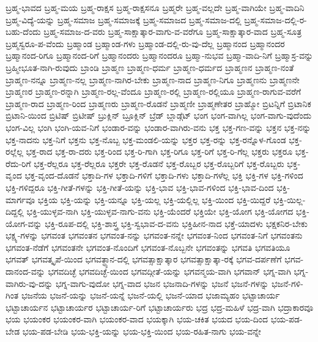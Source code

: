 {ಬ್ರಹ್ಮ-ಭಾವದ
ಬ್ರಹ್ಮ-ಮಯ
ಬ್ರಹ್ಮ-ರಾಕ್ಷಸ
ಬ್ರಹ್ಮ-ರಾಕ್ಷಸನೂ
ಬ್ರಹ್ಮರೇ
ಬ್ರಹ್ಮ-ವಲ್ಲದೇ
ಬ್ರಹ್ಮ-ವಾಗಿಯೇ
ಬ್ರಹ್ಮ-ವಾದಿನಿ
ಬ್ರಹ್ಮ-ವಿದ್ಯೆ-ಯನ್ನು
ಬ್ರಹ್ಮ-ಸಮಾಜ
ಬ್ರಹ್ಮ-ಸಮಾಜಕ್ಕೆ
ಬ್ರಹ್ಮ-ಸಮಾಜದ
ಬ್ರಹ್ಮ-ಸಮಾಜ-ದಲ್ಲಿ
ಬ್ರಹ್ಮ-ಸಮಾಜ-ದಲ್ಲಿ-ರ-ಬಹು-ದೆಂದು
ಬ್ರಹ್ಮ-ಸಮಾಜ-ದ-ವರು
ಬ್ರಹ್ಮ-ಸಾಕ್ಷಾತ್ಕಾರ-ವಾಗು-ವ-ವರೆಗೂ
ಬ್ರಹ್ಮ-ಸಾಕ್ಷಾತ್ಕಾರ-ವಾದ
ಬ್ರಹ್ಮ-ಸೂತ್ರ
ಬ್ರಹ್ಮಸ್ವರೂ-ಪ-ವೆಂದು
ಬ್ರಹ್ಮಾಂಡ
ಬ್ರಹ್ಮಾಂಡ-ಗಳು
ಬ್ರಹ್ಮಾಂಡ-ದಲ್ಲಿ-ರು-ವು-ದೆಲ್ಲ
ಬ್ರಹ್ಮಾನಂದ
ಬ್ರಹ್ಮಾನಂದರ
ಬ್ರಹ್ಮಾನಂದ-ರಿಗೂ
ಬ್ರಹ್ಮಾನಂದ-ರಿಗೆ
ಬ್ರಹ್ಮಾನಂದರು
ಬ್ರಹ್ಮಾನಂದರೂ
ಬ್ರಹ್ಮಾ-ನುಭವ
ಬ್ರಹ್ಮಾ-ವಾದಿ-ನಿಗೆ
ಬ್ರಹ್ಮಾಸ್ರ-ವನ್ನು
ಬ್ರಹ್ಮೀಭೂತ-ನಾಗಿ-ರುವುದು
ಬ್ರಾಂಡಿ
ಬ್ರಾಹ್ಮಣ
ಬ್ರಾಹ್ಮಣ-ಧರ್ಮ
ಬ್ರಾಹ್ಮಣ-ಧರ್ಮದ
ಬ್ರಾಹ್ಮಣನ
ಬ್ರಾಹ್ಮಣ-ನಂತೆ
ಬ್ರಾಹ್ಮಣ-ನನ್ನೂ
ಬ್ರಾಹ್ಮಣ-ನಲ್ಲ
ಬ್ರಾಹ್ಮಣ-ನಾಗಿರ-ಬೇಕು
ಬ್ರಾಹ್ಮಣ-ನಾದ
ಬ್ರಾಹ್ಮಣ-ನಿಗೂ
ಬ್ರಾಹ್ಮಣನು
ಬ್ರಾಹ್ಮಣನೇ
ಬ್ರಾಹ್ಮಣರ
ಬ್ರಾಹ್ಮಣ-ರನ್ನಾಗಿ
ಬ್ರಾಹ್ಮಣ-ರಲ್ಲ-ವೆಂದೂ
ಬ್ರಾಹ್ಮಣ-ರಲ್ಲಿ
ಬ್ರಾಹ್ಮಣ-ರಲ್ಲಿಯೂ
ಬ್ರಾಹ್ಮಣ-ರಾಗುವ-ವರೆಗೆ
ಬ್ರಾಹ್ಮಣ-ರಾದ
ಬ್ರಾಹ್ಮಣ-ರಿಂದ
ಬ್ರಾಹ್ಮಣರು
ಬ್ರಾಹ್ಮಣ-ರೊಡನೆ
ಬ್ರಾಹ್ಮಣೀ
ಬ್ರಾಹ್ಮಣೇತರ
ಬ್ರಾಹ್ಮೋ
ಬ್ರಿಟನ್ನಿಗೆ
ಬ್ರಿಟಾನಿಕ
ಬ್ರಿಟಾನಿ-ಯಿಂದ
ಬ್ರಿಟಿಷ್
ಬ್ರಿಟೀಷ್
ಬ್ರುಕ್ಲಿನ್
ಬ್ರೂಕ್ಲಿನ್
ಬ್ರೆಡ್
ಬ್ಲಾಡ್ಗೆಟ್
ಭಂಗ
ಭಂಗ-ವಾಗಿಲ್ಲ
ಭಂಗ-ವಾಗು-ವುದೆಂದು
ಭಂಗ-ವಿಲ್ಲ
ಭಂಗಿ
ಭಂಗಿ-ಯವ-ನಿಗೆ
ಭಂಡಾರ-ವನ್ನು
ಭಂಡಾರ-ವಾಗಿರು-ವನು
ಭಕ್ತ
ಭಕ್ತ-ಗಣ-ವನ್ನು
ಭಕ್ತನ
ಭಕ್ತ-ನನ್ನು
ಭಕ್ತ-ನಾದನು
ಭಕ್ತ-ನಿಗೆ
ಭಕ್ತನು
ಭಕ್ತ-ನೊಬ್ಬ
ಭಕ್ತ-ಮಂಡಲಿ-ಯನ್ನು
ಭಕ್ತರ
ಭಕ್ತ-ರನ್ನು
ಭಕ್ತ-ರನ್ನೊಳ-ಗೊಂಡ
ಭಕ್ತ-ರಲ್ಲೆಲ್ಲ
ಭಕ್ತ-ರಾದ
ಭಕ್ತ-ರಾ-ದರು
ಭಕ್ತ-ರಿಂದ
ಭಕ್ತ-ರಿ-ಗಾಗಿ
ಭಕ್ತ-ರಿಗೂ
ಭಕ್ತ-ರಿಗೆ
ಭಕ್ತ-ರಿ-ಗೆಲ್ಲ
ಭಕ್ತರು
ಭಕ್ತರೂ
ಭಕ್ತ-ರೆದು-ರಿಗೆ
ಭಕ್ತ-ರೆಲ್ಲರೂ
ಭಕ್ತ-ರೆಲ್ಲರೂ
ಭಕ್ತರೇ
ಭಕ್ತ-ರೊಡನೆ
ಭಕ್ತ-ರೊಬ್ಬರ
ಭಕ್ತ-ರೊಬ್ಬರಿಗೆ
ಭಕ್ತ-ರೊಬ್ಬರು
ಭಕ್ತ-ವೃಂದ
ಭಕ್ತ-ವೃಂದ-ದೊಡನೆ
ಭಕ್ತಾದಿ-ಗಳ
ಭಕ್ತಾದಿ-ಗಳಿಗೆ
ಭಕ್ತಾದಿ-ಗಳು
ಭಕ್ತಾದಿ-ಗಳೆಲ್ಲ
ಭಕ್ತಿ
ಭಕ್ತಿ-ಗಳ
ಭಕ್ತಿ-ಗಳಿಂದ
ಭಕ್ತಿ-ಗಳಿದ್ದರೂ
ಭಕ್ತಿ-ಗೀತೆ-ಗಳನ್ನು
ಭಕ್ತಿ-ಗೀತೆ-ಯನ್ನು
ಭಕ್ತಿ-ಭಾವ
ಭಕ್ತಿ-ಭಾವ-ಗಳಿಂದ
ಭಕ್ತಿ-ಭಾವ-ದಿಂದ
ಭಕ್ತಿ-ಮಾರ್ಗವೂ
ಭಕ್ತಿಯ
ಭಕ್ತಿ-ಯನ್ನು
ಭಕ್ತಿ-ಯನ್ನೂ
ಭಕ್ತಿ-ಯಲ್ಲ
ಭಕ್ತಿ-ಯಲ್ಲಿಲ್ಲ
ಭಕ್ತಿ-ಯಿಂದ
ಭಕ್ತಿ-ಯಿದ್ದರೆ
ಭಕ್ತಿ-ಯಿಲ್ಲ-ದಿದ್ದಲ್ಲಿ
ಭಕ್ತಿ-ಯುಳ್ಳವ-ನಾಗಿ
ಭಕ್ತಿ-ಯುಳ್ಳವ-ನಾಗು-ವನು
ಭಕ್ತಿ-ಯೆಂದರೆ
ಭಕ್ತಿಯೇ
ಭಕ್ತಿ-ಯೋಗ
ಭಕ್ತಿ-ಯೋಗದ
ಭಕ್ತಿ-ಯೋಗ-ವನ್ನು
ಭಕ್ತಿ-ರೂಪ-ದಲ್ಲಿ
ಭಕ್ತಿ-ಶಾಸ್ತ್ರ
ಭಕ್ತಿ-ಸ್ವಭಾವ-ದ-ವನು
ಭಕ್ತಿಹೀನ-ನಾದ
ಭಕ್ತೆ-ಯಾದಳು
ಭಕ್ಷಕನಿರ-ಬೇಕು
ಭಕ್ಷ್ಯ-ಗಳನ್ನು
ಭಗವಂತ
ಭಗವಂತನ
ಭಗವಂತ-ನನ್ನು
ಭಗವಂತ-ನನ್ನೇ
ಭಗವಂತ-ನಿಂದ
ಭಗವಂತ-ನಿಗೆ
ಭಗವಂತನು
ಭಗವಂತ-ನೆಡೆಗೆ
ಭಗವಂತನೇ
ಭಗವಂತ-ನೊಂದಿಗೆ
ಭಗವಂತ-ನೊಬ್ಬನೇ
ಭಗವಂತನ್ನು
ಭಗವತಿ
ಭಗವತಿಯೂ
ಭಗವತ್
ಭಗವತ್ಕೃಪೆ-ಯಿಂದ
ಭಗವತ್ಧ್ಯಾನ-ದಲ್ಲಿ
ಭಗವತ್ಸಾಕ್ಷಾತ್ಕಾರ
ಭಗವತ್ಸಾಕ್ಷಾತ್ಕಾ-ರಕ್ಕೆ
ಭಗವ-ದರ್ಪಣೆಗೆ
ಭಗವ-ದಾನಂದ-ವನ್ನು
ಭಗವದಿಚ್ಛೆ
ಭಗವದಿಚ್ಛೆ-ಯಿಂದ
ಭಗವದ್ಗೀತೆ-ಯನ್ನು
ಭಗವನ್ಮಯ-ವಾಗಿ
ಭಗವಾನ್
ಭಗ್ನ-ವಾಗಿ
ಭಗ್ನ-ವಾಗಿರು-ವು-ದನ್ನು
ಭಗ್ನ-ವಾಗು-ವುದೋ
ಭಗ್ನ-ವಾದ
ಭಜನ
ಭಜನಾದಿ-ಗಳನ್ನು
ಭಜನೆ
ಭಜನೆ-ಗಳನ್ನು
ಭಜನೆ-ಗಳಿ-ಗಿಂತ
ಭಜನೆಯ
ಭಜನೆ-ಯನ್ನು
ಭಜನೆ-ಯನ್ನೆ
ಭಜನೆ-ಯಲ್ಲಿ
ಭಜನೆ-ಯಾದ
ಭಜಾಮ್ಯಹಂ
ಭಟ್ಟಾಚಾರ್ಯ
ಭಟ್ಟಾಚಾರ್ಯನ
ಭಟ್ಟಾಚಾರ್ಯರ
ಭಟ್ಟಾಚಾರ್ಯ-ರಿಗೆ
ಭಟ್ಟಾಚಾರ್ಯರು
ಭದ್ರ
ಭದ್ರ-ಮಹಿಳೆ
ಭದ್ರ-ವಾಗಿ
ಭದ್ರಾಕಾರವೂ
ಭಯ
ಭಯಂಕರ
ಭಯಂಕರ-ವಾಗಿ
ಭಯಂಕರ-ವಾದ
ಭಯಕ್ಕಾಗಿ
ಭಯ-ಚಕಿತ
ಭಯದ
ಭಯ-ದಿಂದ
ಭಯ-ಪಡ-ಬೇಡ
ಭಯ-ಪಡ-ಬೇಡಿ
ಭಯ-ಭಕ್ತಿ-ಯನ್ನು
ಭಯ-ಭಕ್ತಿ-ಯಿಂದ
ಭಯ-ರಹಿತ-ನಾಗು
ಭಯ-ವನ್ನೇ
}
